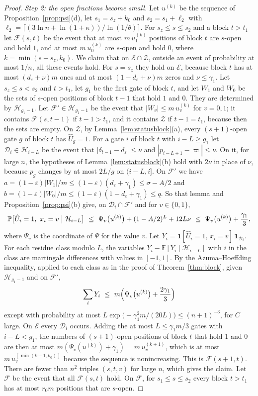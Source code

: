 \documentclass[11pt]{amsart}
\theoremstyle{definition}
\theoremstyle{remark}
\newcommand{\eps}{\varepsilon}
\newcommand{\PP}{\mathbb{P}}
\newcommand{\EE}{\mathbb{E}}
\begin{document}
\begin{proof}
\emph{Step 2: the open fractions become small.} Let $u^{(k)}$ be the sequence of
Proposition~\ref{prop:psi}(d), let $s_1=s_z+k_0$ and $s_2=s_1+\ell_2$ with
$\ell_2=\lceil(3\ln n+\ln(1+\kappa))/\ln(1/\theta)\rceil$. For $s_z\le s\le s_2$ and a block
$t>t_1$ let $\mathcal F(s,t)$ be the event that at most $m\,u^{(k)}_1$ positions of block $t$ are
$s$-open and hold $1$, and at most $m\,u^{(k)}_0$ are $s$-open and hold $0$, where
$k=\min(s-s_z,k_0)$. We claim that on $\mathcal E\cap\mathcal Z$, outside an event of probability
at most $1/n$, all these events hold. For $s=s_z$ they hold on $\mathcal E$, because block $t$
has at most $(d_\eps+\nu)m$ ones and at most $(1-d_\eps+\nu)m$ zeros and $\nu\le\gamma_1$. Let
$s_z\le s<s_2$ and $t>t_1$, let $g_1$ be the first gate of block $t$, and let $W_1$ and $W_0$ be
the sets of $s$-open positions of block $t-1$ that hold $1$ and $0$. They are determined by
$\mathcal H_{g_1-1}$. Let $\mathcal F'\in\mathcal H_{g_1-1}$ be the event that
$|W_v|\le m\,u^{(k)}_v$ for $v=0,1$; it contains $\mathcal F(s,t-1)$ if $t-1>t_1$, and it
contains $\mathcal Z$ if $t-1=t_1$, because then the sets are empty. On $\mathcal Z$, by
Lemma~\ref{lem:statusblock}(a), every $(s+1)$-open gate $g$ of block $t$ has $\hat U_g=1$. For a
gate $i$ of block $t$ with $i-L\ge g_1$ let $\mathcal D_i\in\mathcal H_{i-L}$ be the event that
$|\delta_{t-1}-d_\eps|\le\nu$ and $|p_{i-L+1}-\varpi|\le\nu$. On it, for large $n$, the
hypotheses of Lemma~\ref{lem:statusblock}(b) hold with $2\nu$ in place of $\nu$, because $p_g$
changes by at most $2L/g$ on $(i-L,i]$. On $\mathcal F'$ we have
$a=(1-\eps)|W_1|/m\le(1-\eps)(d_\eps+\gamma_1)\le\sigma-A/2$ and
$b=(1-\eps)|W_0|/m\le(1-\eps)(1-d_\eps+\gamma_1)\le q$. So that lemma and
Proposition~\ref{prop:psi}(b) give, on $\mathcal D_i\cap\mathcal F'$ and for $v\in\{0,1\}$,
\[
\PP\bigl[\hat U_i=1,\ x_i=v\bigm|\mathcal H_{i-L}\bigr]\ \le\ \Psi_v\bigl(u^{(k)}\bigr)+(1-A/2)^L+12L\nu
\ \le\ \Psi_v\bigl(u^{(k)}\bigr)+\frac{\gamma_1}3 ,
\]
where $\Psi_v$ is the coordinate of $\Psi$ for the value $v$. Let
$Y_i=\mathbf 1[\hat U_i=1,\,x_i=v]\,\mathbf 1_{\mathcal D_i}$. For each residue class modulo $L$,
the variables $Y_i-\EE[Y_i\mid\mathcal H_{i-L}]$ with $i$ in the class are martingale
differences with values in $[-1,1]$. By the Azuma--Hoeffding inequality, applied to each class
as in the proof of Theorem~\ref{thm:block}, given $\mathcal H_{g_1-1}$ and on $\mathcal F'$,
\[
\sum_iY_i\ \le\ m\Bigl(\Psi_v\bigl(u^{(k)}\bigr)+\frac{2\gamma_1}3\Bigr)
\]
except with probability at most $L\exp\bigl(-\gamma_1^2m/(20L)\bigr)\le(n+1)^{-3}$, for $C$
large. On $\mathcal E$ every $\mathcal D_i$ occurs. Adding the at most $L\le\gamma_1m/3$ gates
with $i-L<g_1$, the numbers of $(s+1)$-open positions of block $t$ that hold $1$ and $0$ are then
at most $m(\Psi_v(u^{(k)})+\gamma_1)=m\,u^{(k+1)}_v$, which is at most $m\,u^{(\min(k+1,k_0))}_v$
because the sequence is nonincreasing. This is $\mathcal F(s+1,t)$. There are fewer than $n^2$
triples $(s,t,v)$ for large $n$, which gives the claim. Let $\mathcal F$ be the event that all
$\mathcal F(s,t)$ hold. On $\mathcal F$, for $s_1\le s\le s_2$ every block $t>t_1$ has at most
$r_0m$ positions that are $s$-open.


\end{proof}
\end{document}
